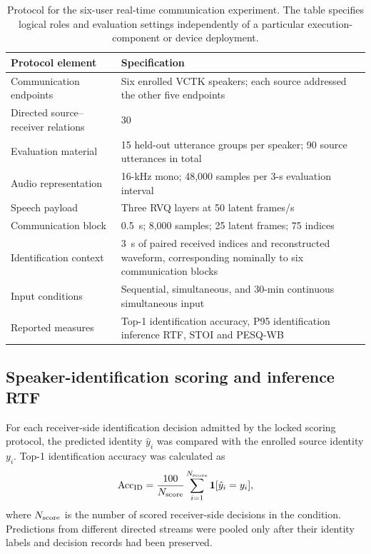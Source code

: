 \begin{table}[t]
\centering
\caption{Protocol for the six-user real-time communication experiment. The table specifies logical roles and evaluation settings independently of a particular execution-component or device deployment.}
\label{tab:sv3-six-user-protocol}
\small
\begin{tabularx}{\textwidth}{@{}p{}Y@{}}
\toprule
Protocol element & Specification\\
\midrule
Communication endpoints & Six enrolled VCTK speakers; each source addressed the other five endpoints\\
Directed source--receiver relations & 30\\
Evaluation material & 15 held-out utterance groups per speaker; 90 source utterances in total\\
Audio representation & 16-kHz mono; 48,000 samples per 3-s evaluation interval\\
Speech payload & Three RVQ layers at 50 latent frames/s\\
Communication block & 0.5~s; 8,000 samples; 25 latent frames; 75 indices\\
Identification context & 3~s of paired received indices and reconstructed waveform, corresponding nominally to six communication blocks\\
Input conditions & Sequential, simultaneous, and 30-min continuous simultaneous input\\
Reported measures & Top-1 identification accuracy, P95 identification inference RTF, STOI and PESQ-WB\\
\bottomrule
\end{tabularx}
\end{table}

\subsection{Speaker-identification scoring and inference RTF}
For each receiver-side identification decision admitted by the locked scoring protocol, the predicted identity $\hat y_i$ was compared with the enrolled source identity $y_i$. Top-1 identification accuracy was calculated as
\begin{equation}
 \operatorname{Acc}_{\rm ID}
 =\frac{100}{N_{\rm score}}
 \sum_{i=1}^{N_{\rm score}}\mathbf 1[\hat y_i=y_i],
 \label{eq:sv3-six-user-accuracy}
\end{equation}
where $N_{\rm score}$ is the number of scored receiver-side decisions in the condition. Predictions from different directed streams were pooled only after their identity labels and decision records had been preserved.

